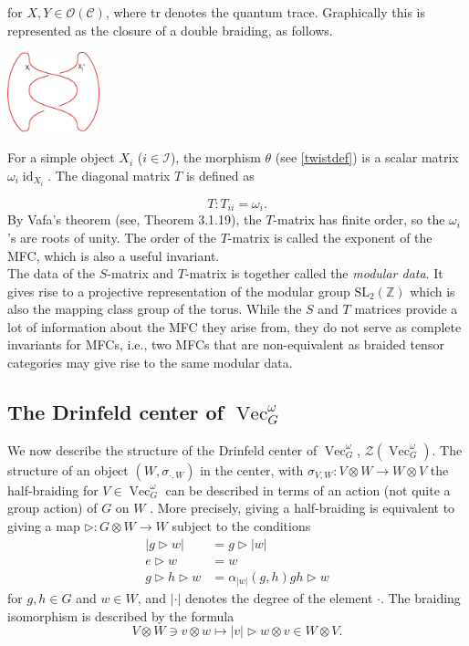 \documentclass[11pt]{book}
\theoremstyle{Rem}
\theoremstyle{definition}
\numberwithin{equation}{section}
\newcommand\hit{\triangleright}
\newcommand\id{\operatorname{id}}
\newcommand\ot{\otimes}
\newcommand\Vect{\operatorname{Vec}}
\newcommand\Z{\mathbb Z}
\newcommand\Cat{\mathcal C}
\newcommand\OO{\mathcal O}
\begin{document}
for $X,Y \in \mathcal{\OO(\Cat)}$, where tr denotes the quantum trace. Graphically this is represented as the closure of a double braiding, as follows.
\begin{center}
\includegraphics[width=0.2\textwidth]{s-matrix.eps}
\end{center}
For a simple object $X_i$ ($i\in \mathcal{I}$), the morphism $\theta$ (see \ref{twistdef}) is a scalar matrix $\omega_i \id_{X_i}$. The diagonal matrix $T$ is defined as 

\begin{equation}\label{T}
	T: T_{ii} = \omega_i.
\end{equation}
By Vafa's theorem (see\cite{BK}, Theorem 3.1.19), the $T$-matrix has finite order, so the $\omega_i$'s are roots of unity. The order of the $T$-matrix is called the exponent of the MFC, which is also a useful invariant.\\
The data of the $S$-matrix and $T$-matrix is together called the \textit{modular data}. It gives rise to a projective representation of the modular group $\text{SL}_2(\Z)$ which is also the mapping class group of the torus. While the $S$ and $T$ matrices provide a lot of information about the MFC they arise from, they do not serve as complete invariants for MFCs, i.e., two MFCs that are non-equivalent as braided tensor categories may give rise to the same modular data. \cite{2017arXiv170802796M}

\subsection {The Drinfeld center of $\Vect^\omega_G$}\label{CenterVecOmegaG}
We now describe the structure of the Drinfeld center of $\Vect^\omega_G$, $\mathcal{Z}(\Vect^\omega_G)$. The structure of an object $(W,\sigma_{\cdot,W})$ in the center, with $\sigma_{V,W}\colon V\ot W\to W\ot V$ the half-braiding for $V\in\Vect_G^\omega$ can be described in terms of an action (not quite a group action) of $G$ on $W$ \cite{Maj:QDQHA}. More precisely, giving a half-braiding is equivalent to giving a map
$\hit\colon G\otimes W\to W$ subject to the conditions
\begin{align}
  |g\hit w|&=g\hit|w|\\
  e\hit w&=w\\
  g\hit h\hit w&=\alpha_{|w|}(g, h)gh\hit w
\end{align}
for $g,h\in G$ and $w\in W$, and $|\cdot|$ denotes the degree of the element $\cdot$. The braiding isomorphism is described by the formula
\begin{equation*}
  V\ot W\ni v\ot w\mapsto |v|\hit w\ot v\in W\ot V.
\end{equation*}
\end{document}

